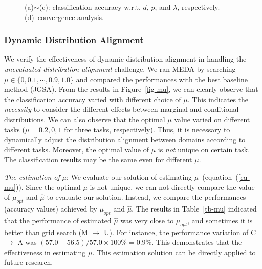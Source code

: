 \documentclass[sigconf]{acmart}
\begin{document}
\begin{figure*}[t!]
	\centering
	\vspace{-.15in}
	\hspace{-.2in}
	\vspace{-.15in}
	\caption{(a)$\sim$(c): classification accuracy w.r.t. $d$, $p$, and $\lambda$, respectively. (d)~convergence analysis.}
	\vspace{-.15in}
	\label{fig-p-d}
\end{figure*}

\subsubsection{Dynamic Distribution Alignment}

We verify the effectiveness of dynamic distribution alignment in handling the \textit{unevaluated distribution alignment} challenge. We ran MEDA by searching $\mu \in \{0,0.1,\cdots,0.9,1.0\}$ and compared the performances with the best baseline method (JGSA). From the results in Figure~\ref{fig-mu}, we can clearly observe that the classification accuracy varied with different choice of $\mu$. This indicates the \textit{necessity} to consider the different effects between marginal and conditional distributions. We can also observe that the optimal $\mu$ value varied on different tasks ($\mu=0.2,0,1$ for three tasks, respectively). Thus, it is necessary to dynamically adjust the distribution alignment between domains according to different tasks. Moreover, the optimal value of $\mu$ is \textit{not} unique on certain task. The classification results may be the same even for different $\mu$.

\textit{The estimation of } $\mu$: We evaluate our solution of estimating $\mu$~(equation~(\ref{eq-mu})). Since the optimal $\mu$ is not unique, we can not directly compare the value of $\mu_{opt}$ and $\hat{\mu}$ to evaluate our solution. Instead, we compare the performances (accuracy values) achieved by $\mu_{opt}$ and $\hat{\mu}$. The results in Table~\ref{tb-mu} indicated that the performance of estimated $\hat{\mu}$ was very close to $\mu_{opt}$, and sometimes it is better than grid search (M $\rightarrow$ U). For instance, the performance variation of C $\rightarrow$ A was $(57.0-56.5) / 57.0 \times 100\% = 0.9\%$. This demonstrates that the effectiveness in estimating $\mu$. This estimation solution can be directly applied to future research.
\end{document}
